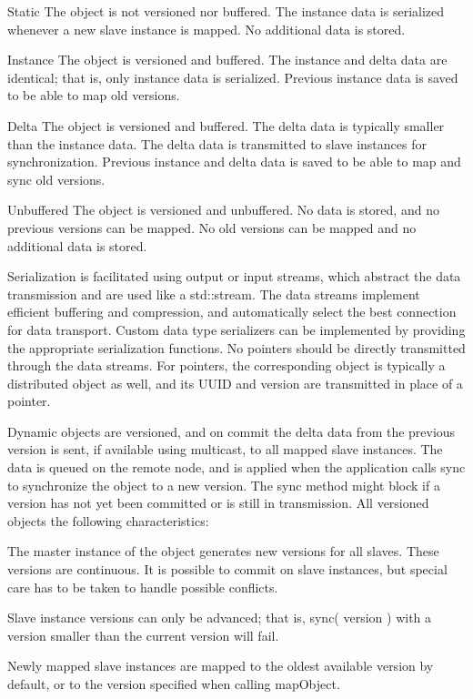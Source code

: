 \documentclass[10pt,journal,compsoc]{IEEEtran}
\begin{document}
\begin{compactdesc}
\item[Static] The object is not versioned nor buffered. The instance data is
  serialized whenever a new slave instance is mapped. No additional data is
  stored.
\item[Instance] The object is versioned and buffered. The instance and delta
  data are identical; that is, only instance data is serialized. Previous
  instance data is saved to be able to map old versions.
\item[Delta] The object is versioned and buffered. The delta data is typically
  smaller than the instance data. The delta data is transmitted to slave
  instances for synchronization. Previous instance and delta data is saved to be
  able to map and sync old versions.
\item[Unbuffered] The object is versioned and unbuffered. No data is stored, and
  no previous versions can be mapped. No old versions can be mapped and no
  additional data is stored.
\end{compactdesc}

Serialization is facilitated using output or input streams, which abstract the
data transmission and are used like a \textsf{std::stream}. The data streams
implement efficient buffering and compression, and automatically select the best
connection for data transport. Custom data type serializers can be implemented
by providing the appropriate serialization functions. No pointers should be
directly transmitted through the data streams. For pointers, the corresponding
object is typically a distributed object as well, and its UUID and version are
transmitted in place of a pointer.

Dynamic objects are versioned, and on \textsf{commit} the delta data from the
previous version is sent, if available using multicast, to all mapped slave
instances. The data is queued on the remote node, and is applied when the
application calls \textsf{sync} to synchronize the object to a new version. The
\textsf{sync} method might block if a version has not yet been committed or is
still in transmission. All versioned objects the following characteristics:

\begin{compactitem}
\item The master instance of the object generates new versions for all
  slaves. These versions are continuous. It is possible to commit on slave
  instances, but special care has to be taken to handle possible
  conflicts.
\item Slave instance versions can only be advanced; that is, \textsf{sync(
  version )} with a version smaller than the current version will fail.
\item Newly mapped slave instances are mapped to the oldest available
  version by default, or to the version specified when calling
  \textsf{mapObject}.
\end{compactitem}
\end{document}

